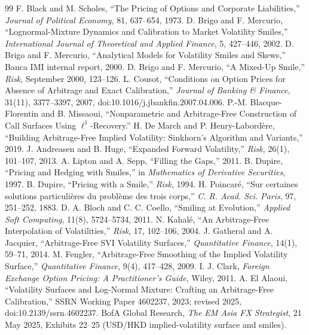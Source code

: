 \documentclass[11pt]{article}
\begin{document}
\begin{thebibliography}{99}
 F. Black and M. Scholes, ``The Pricing of Options and Corporate Liabilities,'' \emph{Journal of Political Economy}, 81, 637--654, 1973.
 D. Brigo and F. Mercurio, ``Lognormal-Mixture Dynamics and Calibration to Market Volatility Smiles,'' \emph{International Journal of Theoretical and Applied Finance}, 5, 427--446, 2002.
 D. Brigo and F. Mercurio, ``Analytical Models for Volatility Smiles and Skews,'' Banca IMI internal report, 2000.
 D. Brigo and F. Mercurio, ``A Mixed-Up Smile,'' \emph{Risk}, September 2000, 123--126.
 L. Cousot, ``Conditions on Option Prices for Absence of Arbitrage and Exact Calibration,'' \emph{Journal of Banking \& Finance}, 31(11), 3377--3397, 2007, doi:10.1016/j.jbankfin.2007.04.006.
 P.-M. Blacque-Florentin and B. Missaoui, ``Nonparametric and Arbitrage-Free Construction of Call Surfaces Using $\ell^1$-Recovery.''
 H. De March and P. Henry-Labord\`ere, ``Building Arbitrage-Free Implied Volatility: Sinkhorn's Algorithm and Variants,'' 2019.
 J. Andreasen and B. Huge, ``Expanded Forward Volatility,'' \emph{Risk}, 26(1), 101--107, 2013.
 A. Lipton and A. Sepp, ``Filling the Gaps,'' 2011.
 B. Dupire, ``Pricing and Hedging with Smiles,'' in \emph{Mathematics of Derivative Securities}, 1997.
 B. Dupire, ``Pricing with a Smile,'' \emph{Risk}, 1994.
 H. Poincar\'e, ``Sur certaines solutions particuli\`eres du probl\`eme des trois corps,'' \emph{C. R. Acad. Sci. Paris}, 97, 251--252, 1883.
 D. A. Bloch and C. C. Coello, ``Smiling at Evolution,'' \emph{Applied Soft Computing}, 11(8), 5724--5734, 2011.
 N. Kahal\'e, ``An Arbitrage-Free Interpolation of Volatilities,'' \emph{Risk}, 17, 102--106, 2004.
 J. Gatheral and A. Jacquier, ``Arbitrage-Free SVI Volatility Surfaces,'' \emph{Quantitative Finance}, 14(1), 59--71, 2014.
 M. Fengler, ``Arbitrage-Free Smoothing of the Implied Volatility Surface,'' \emph{Quantitative Finance}, 9(4), 417--428, 2009.
 I. J. Clark, \emph{Foreign Exchange Option Pricing: A Practitioner's Guide}, Wiley, 2011.
 A. El Alaoui, ``Volatility Surfaces and Log-Normal Mixture: Crafting an Arbitrage-Free Calibration,'' SSRN Working Paper 4602237, 2023; revised 2025, doi:10.2139/ssrn.4602237.
 BofA Global Research, \emph{The EM Asia FX Strategist}, 21 May 2025, Exhibits 22--25 (USD/HKD implied-volatility surface and smiles).
\end{thebibliography}
\end{document}
